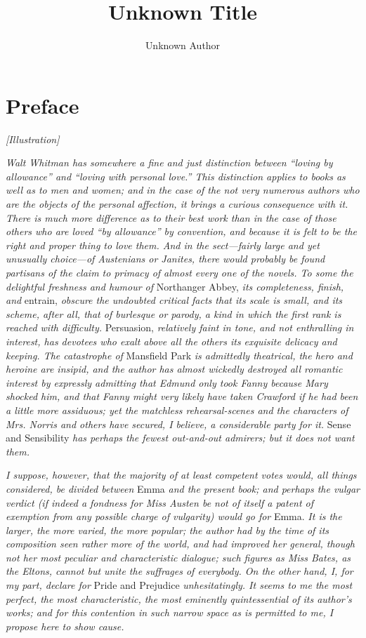 \documentclass[12pt]{book}
\title{Unknown Title}
\author{Unknown Author}
\date{}
\begin{document}
\frontmatter
\maketitle
\tableofcontents
\mainmatter

\chapter*{Preface}

\emph{[Illustration]}

\textit{Walt Whitman has somewhere a fine and just distinction between ``loving by allowance'' and ``loving with personal love.'' This distinction applies to books as well as to men and women; and in the case of the not very numerous authors who are the objects of the personal affection, it brings a curious consequence with it. There is much more difference as to their best work than in the case of those others who are loved ``by allowance'' by convention, and because it is felt to be the right and proper thing to love them. And in the sect---fairly large and yet unusually choice---of Austenians or Janites, there would probably be found partisans of the claim to primacy of almost every one of the novels. To some the delightful freshness and humour of} Northanger Abbey, \textit{its completeness, finish, and} entrain, \textit{obscure the undoubted critical facts that its scale is small, and its scheme, after all, that of burlesque or parody, a kind in which the first rank is reached with difficulty.} Persuasion, \textit{relatively faint in tone, and not enthralling in interest, has devotees who exalt above all the others its exquisite delicacy and keeping. The catastrophe of} Mansfield Park \textit{is admittedly theatrical, the hero and heroine are insipid, and the author has almost wickedly destroyed all romantic interest by expressly admitting that Edmund only took Fanny because Mary shocked him, and that Fanny might very likely have taken Crawford if he had been a little more assiduous; yet the matchless rehearsal-scenes and the characters of Mrs. Norris and others have secured, I believe, a considerable party for it.} Sense and Sensibility \textit{has perhaps the fewest out-and-out admirers; but it does not want them.}

\textit{I suppose, however, that the majority of at least competent votes would, all things considered, be divided between} Emma \textit{and the present book; and perhaps the vulgar verdict (if indeed a fondness for Miss Austen be not of itself a patent of exemption from any possible charge of vulgarity) would go for} Emma. \textit{It is the larger, the more varied, the more popular; the author had by the time of its composition seen rather more of the world, and had improved her general, though not her most peculiar and characteristic dialogue; such figures as Miss Bates, as the Eltons, cannot but unite the suffrages of everybody. On the other hand, I, for my part, declare for} Pride and Prejudice \textit{unhesitatingly. It seems to me the most perfect, the most characteristic, the most eminently quintessential of its author's works; and for this contention in such narrow space as is permitted to me, I propose here to show cause.}
\end{document}

